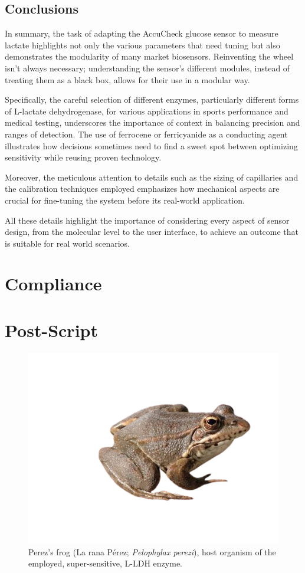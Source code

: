 \documentclass[conference]{IEEEtran}
\newcommand\wordcount{
   \immediate\write18{wordcount.bat \jobname.tex}
   
}
\begin{document}

\subsection{Conclusions}

In summary, the task of adapting the AccuCheck glucose sensor to measure 
lactate highlights not only the various parameters that 
need tuning but also demonstrates the modularity of many market biosensors. 
Reinventing the wheel isn't always necessary; understanding the sensor's 
different modules, instead of treating them as a black box, allows for their 
use in a modular way. 

Specifically, the careful selection of different enzymes, particularly different forms of L-lactate 
dehydrogenase, for various applications in sports performance and medical 
testing, underscores the importance of context in balancing precision and ranges of detection.
 The use of ferrocene or ferricyanide as a conducting agent 
illustrates how decisions sometimes need to find a sweet spot between optimizing sensitivity 
while reusing proven technology.

Moreover, the meticulous attention to details such as the sizing of capillaries 
and the calibration techniques employed emphasizes how mechanical 
aspects are crucial for fine-tuning the system before its real-world 
application.

All these details highlight the importance of considering every aspect of 
sensor design, from the molecular level to the user interface, to achieve an
 outcome that is suitable for real world scenarios.






\section{Compliance}
\wordcount
\section{Post-Script}
\begin{figure}[h]
   \centering
   \includegraphics[width=0.9\columnwidth]{images/frog.png}
   \caption{Perez's frog (La rana Pérez; \textit{Pelophylax perezi}), host organism of the employed, super-sensitive, L-LDH enzyme.}
   \label{fig:perezfrog}
\end{figure}
\end{document}
